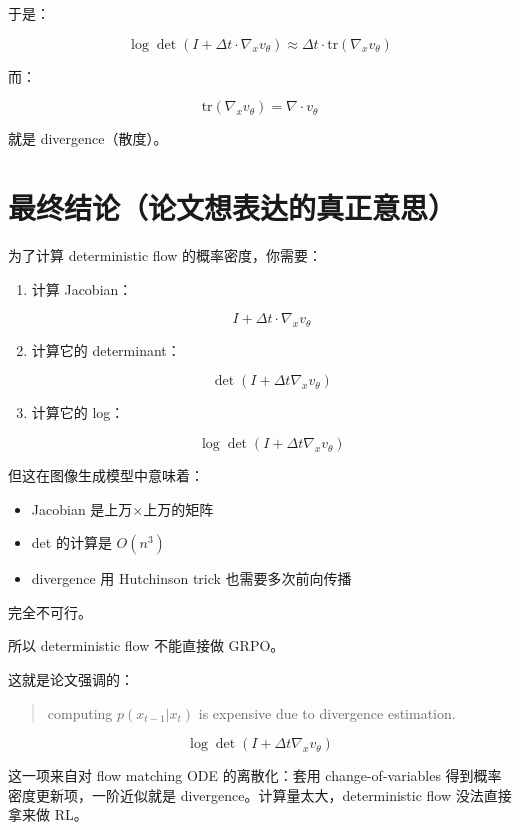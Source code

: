 于是：

\[
\log \det (I + \Delta t \cdot \nabla_x v_\theta) \approx \Delta t\cdot \text{tr}(\nabla_x v_\theta)
\]

而：

\[
\text{tr}(\nabla_x v_\theta) = \nabla \cdot v_\theta
\]

就是 divergence（散度）。

\section{最终结论（论文想表达的真正意思）}

为了计算 deterministic flow 的概率密度，你需要：

\begin{enumerate}
  \item 计算 Jacobian：
  
  \[
  I + \Delta t\cdot\nabla_x v_\theta
  \]
  \item 计算它的 determinant：
  
  \[
  \det(I + \Delta t\nabla_x v_\theta)
  \]
  \item 计算它的 log：
  
  \[
  \log \det(I + \Delta t\nabla_x v_\theta)
  \]
\end{enumerate}

但这在图像生成模型中意味着：

\begin{itemize}
  \item Jacobian 是上万×上万的矩阵
  \item det 的计算是  \(O(n^3)\)
  \item divergence 用 Hutchinson trick 也需要多次前向传播
\end{itemize}

完全不可行。

所以 deterministic flow 不能直接做 GRPO。

这就是论文强调的：

\begin{quote}
computing \(p(x_{t−1}|x_t)\) is expensive due to divergence estimation.
\end{quote}

\[
\log \det(I + \Delta t \nabla_x v_\theta)
\]

这一项来自对 flow matching ODE 的离散化：套用 change-of-variables 得到概率密度更新项，一阶近似就是 divergence。计算量太大，deterministic flow 没法直接拿来做 RL。
